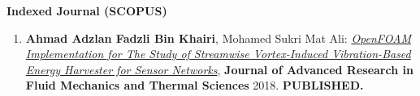 \documentclass[oneside]{utmthesis}
\begin{document}
\noindent \textbf{Indexed Journal (SCOPUS)}
\begin{enumerate}
  \item \textbf{Ahmad Adzlan Fadzli Bin Khairi}, Mohamed Sukri Mat Ali: \textit{\underline{OpenFOAM} \underline{Implementation for The Study of Streamwise Vortex-Induced Vibration-Based } \underline{Energy Harvester for Sensor Networks}}, \textbf{Journal of Advanced Research in Fluid Mechanics and Thermal Sciences} 2018. \textbf{PUBLISHED.}
\end{enumerate}

\endmatter
\end{document}
